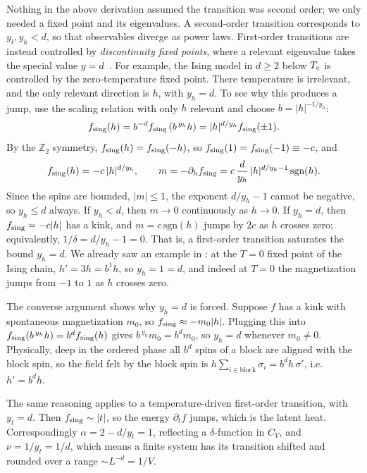 Nothing in the above derivation assumed the transition was second order; we only
needed a fixed point and its eigenvalues. A second-order transition corresponds
to $y_t,y_h<d$, so that observables diverge as power laws. First-order
transitions are instead controlled by
{\it discontinuity fixed points}, where a relevant
eigenvalue takes the special value $y=d$~\cite{nienhuis_first-order_1975}.
For example, the Ising model in $d\geq2$ below $T_{\rm c}$ is controlled by the
zero-temperature fixed point. There temperature is irrelevant, and the only relevant direction is
$h$, with $y_h=d$. To see why this produces a jump, use the scaling relation
with only $h$ relevant and choose $b=|h|^{-1/y_h}$:
\begin{equation}
  f_{\text{sing}}(h)=b^{-d}f_{\text{sing}}\left(b^{\,y_h}h\right)=|h|^{d/y_h}f_{\text{sing}}(\pm1).
\end{equation}
By the $\mathbb{Z}_2$ symmetry, $f_{\text{sing}}(h)=f_{\text{sing}}(-h)$, so
$f_{\text{sing}}(1)=f_{\text{sing}}(-1)\equiv-c$, and
\begin{equation}
  f_{\text{sing}}(h)=-c\,|h|^{d/y_h},~~~~~~m=-\partial_hf_{\text{sing}}
  =c\,\frac{d}{y_h}\,|h|^{d/y_h-1}\,\text{sgn}(h).
\end{equation}
Since the spins are bounded, $|m|\leq1$, the exponent $d/y_h-1$ cannot be
negative, so $y_h\leq d$ always. If $y_h<d$, then $m\to0$ continuously as
$h\to0$. If $y_h=d$, then $f_{\text{sing}}=-c|h|$ has a kink, and $m=c\,\text{sgn}(h)$
jumps by $2c$ as $h$ crosses zero; equivalently, $1/\delta=d/y_h-1=0$. That
is, a first-order transition saturates the bound $y_h=d$. We already saw an
example in : at the $T=0$ fixed point of the  Ising
chain, $h'=3h=b^1h$, so $y_h=1=d$, and indeed at $T=0$ the magnetization jumps from
$-1$ to $1$ as $h$ crosses zero.

The converse argument shows why $y_h=d$ is forced. Suppose $f$ has a kink with
spontaneous magnetization $m_0$, so $f_{\text{sing}}\approx-m_0|h|$. Plugging this into
$f_{\text{sing}}(b^{\,y_h}h)=b^df_{\text{sing}}(h)$ gives $b^{\,y_h}m_0=b^dm_0$, so $y_h=d$
whenever $m_0\neq0$. Physically, deep in the ordered phase all $b^d$ spins
of a block are aligned with the block spin, so the field felt by the block spin is
$h\sum_{i\in\text{block}}\sigma_i=b^dh\,\sigma'$, i.e. $h'=b^dh$.

The same reasoning applies to a temperature-driven first-order transition,
with $y_t=d$. Then $f_{\text{sing}}\sim|t|$, so the energy $\partial_t f$ jumps, which is
the latent heat. Correspondingly $\alpha=2-d/y_t=1$, reflecting a
$\delta$-function in $C_V$, and $\nu=1/y_t=1/d$, which means a finite system has
its transition shifted and rounded over a range $\sim L^{-d}=1/V$.

